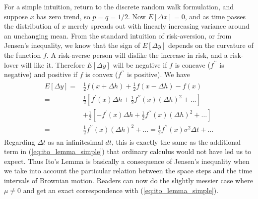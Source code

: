 \documentclass[\topdir/lecture\_notes.tex]{subfiles}
\begin{document}
For a simple intuition, return to the discrete random walk formulation, and suppose \(x\) has zero trend, so \(p=q=1 / 2\). Now \(E[\Delta x]=0\),
and as time passes the distribution of \(x\) merely spreads out with linearly increasing variance around an unchanging mean. From the standard intuition of risk-aversion, or from Jensen's inequality, we know that the sign of \(E[\Delta y]\) depends on the curvature of the function \(f\). A risk-averse person will dislike the increase in risk, and a risk-lover will like it. Therefore \(E[\Delta y]\) will be negative if \(f\) is concave (\(f^{\prime \prime}\) is negative) and positive if \(f\) is convex (\(f^{\prime \prime}\) is positive). We have
\begin{align*}
\begin{aligned}
E[\Delta y]= & \frac{1}{2} f(x+\Delta h)+\frac{1}{2} f(x-\Delta h)-f(x) \\
= & \frac{1}{2}\left[f^{\prime}(x) \Delta h+\frac{1}{2} f^{\prime \prime}(x)(\Delta h)^{2}+\ldots\right] \\
& +\frac{1}{2}\left[-f^{\prime}(x) \Delta h+\frac{1}{2} f^{\prime \prime}(x)(\Delta h)^{2}+\ldots\right] \\
= & \frac{1}{2} f^{\prime \prime}(x)(\Delta h)^{2}+\ldots=\frac{1}{2} f^{\prime \prime}(x) \sigma^{2} \Delta t+\ldots
\end{aligned}
\end{align*}
Regarding \(\Delta t\) as an infinitesimal \(dt\), this is exactly the same as the additional term in (\ref{eq:ito_lemma_simple}) that ordinary calculus would not have led us to expect. Thus Ito's Lemma is basically a consequence of Jensen's inequality when we take into account the particular relation between the space steps and the time intervals of Brownian motion. Readers can now do the slightly messier case where \(\mu \neq 0\) and get an exact correspondence with (\ref{eq:ito_lemma_simple}).
\end{document}
